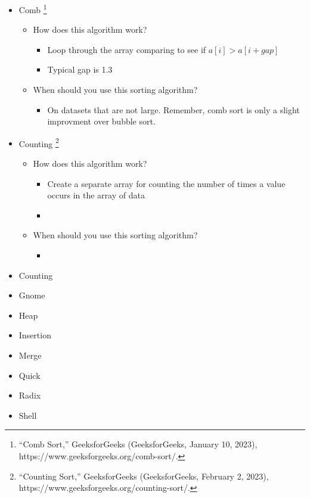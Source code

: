 \documentclass[11pt]{article}
\begin{document}
\begin{itemize}
\item{Comb}
\footnote{“Comb Sort,” GeeksforGeeks (GeeksforGeeks, January 10, 2023), https://www.geeksforgeeks.org/comb-sort/.}
\begin{itemize}
\addtolength{\itemindent}{0.80cm}
\itemsep0em 
\item{How does this algorithm work?}
\begin{itemize}
\addtolength{\itemindent}{0.80cm}
\itemsep0em 
\item{Loop through the array comparing to see if $a[i] > a[i + gap] $}
\item{Typical gap is 1.3}
\end{itemize}
\item{When should you use this sorting algorithm?}
\begin{itemize}
\addtolength{\itemindent}{0.80cm}
\itemsep0em 
\item{On datasets that are not large. Remember, comb sort is only a slight improvment over bubble sort.}
\end{itemize}
\end{itemize}

\item{Counting}
\footnote{“Counting Sort,” GeeksforGeeks (GeeksforGeeks, February 2, 2023), https://www.geeksforgeeks.org/counting-sort/.}
\begin{itemize}
\addtolength{\itemindent}{0.80cm}
\itemsep0em 
\item{How does this algorithm work?}
\begin{itemize}
\addtolength{\itemindent}{0.80cm}
\itemsep0em 
\item{Create a separate array for counting the number of times a value occurs in the array of data}
\item{}
\end{itemize}
\item{When should you use this sorting algorithm?}
\begin{itemize}
\addtolength{\itemindent}{0.80cm}
\itemsep0em 
\item{}
\end{itemize}
\end{itemize}

\item{Counting}
\item{Gnome}
\item{Heap}
\item{Insertion}
\item{Merge}
\item{Quick}
\item{Radix}
\item{Shell}
\end{itemize}
\end{document}
